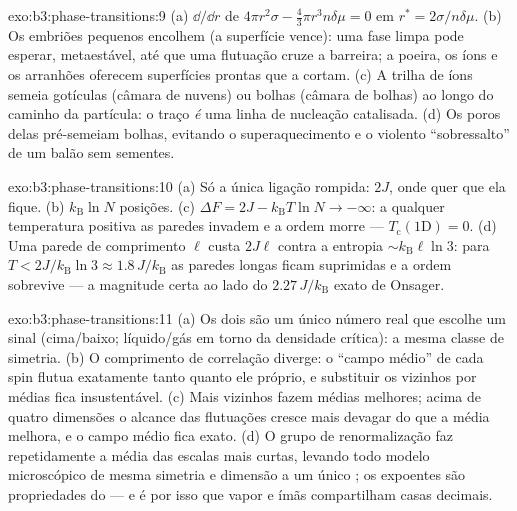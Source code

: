 \begin{solution}{exo:b3:phase-transitions:9}
(a) $\dd/\dd r$ de $4\pi r^2\sigma - \tfrac43\pi r^3n\delta\mu = 0$
em $r^* = 2\sigma/n\delta\mu$. (b) Os embriões pequenos encolhem (a
superfície vence): uma fase limpa pode esperar, metaestável, até que uma
flutuação cruze a barreira; a poeira, os íons e os arranhões oferecem
superfícies prontas que a cortam. (c) A trilha de íons semeia gotículas
(câmara de nuvens) ou bolhas (câmara de bolhas) ao longo do caminho da
partícula: o traço \emph{é} uma linha de nucleação catalisada. (d) Os
poros delas pré-semeiam bolhas, evitando o superaquecimento e o violento
``sobressalto'' de um balão sem sementes.
\end{solution}

\begin{solution}{exo:b3:phase-transitions:10}
(a) Só a única ligação rompida: $2J$, onde quer que ela fique. (b)
$k_{\text{B}}\ln N$ posições. (c) $\Delta F = 2J -
k_{\text{B}}T\ln N \to -\infty$: a qualquer temperatura positiva
as paredes invadem e a ordem morre --- $T_{\text{c}}(1\text{D}) = 0$. (d)
Uma parede de comprimento $\ell$ custa $2J\ell$ contra a entropia
$\sim k_{\text{B}}\ell\ln3$: para $T < 2J/k_{\text{B}}\ln3 \approx
1.8\,J/k_{\text{B}}$ as paredes longas ficam suprimidas e a ordem
sobrevive --- a magnitude certa ao lado do
$2.27\,J/k_{\text{B}}$ exato de Onsager.
\end{solution}

\begin{solution}{exo:b3:phase-transitions:11}
(a) Os dois  são um único número real que escolhe um
sinal (cima/baixo; líquido/gás em torno da densidade crítica): a mesma
classe de simetria. (b) O comprimento de correlação diverge: o ``campo
médio'' de cada spin flutua exatamente tanto quanto ele próprio, e
substituir os vizinhos por médias fica insustentável. (c) Mais
vizinhos fazem médias melhores; acima de quatro dimensões o alcance das
flutuações cresce mais devagar do que a média melhora, e o campo médio
fica exato. (d) O grupo de renormalização faz repetidamente a média das
escalas mais curtas, levando todo modelo microscópico de mesma simetria
e dimensão a um único ; os expoentes são
propriedades do  --- e é por isso que vapor e ímãs
compartilham casas decimais.
\end{solution}

